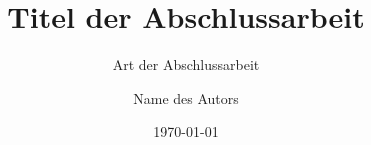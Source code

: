 \titlehead{\centering\texttt{[image: htw-logo]}}%
\subject{Hochschule für Technik und Wirtschaft Dresden\\%
		Fakultät hier einfügen}%
\title{Titel der Abschlussarbeit}%
\subtitle{Art der Abschlussarbeit}%
\author{Name des Autors}%
\date{\today}%
\publishers{Betreuer usw. einfügen}%
\maketitle%
\newpage%